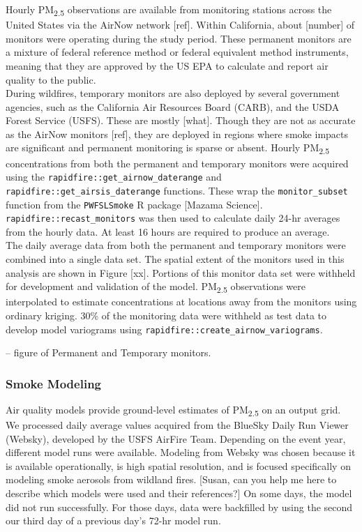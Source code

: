 \documentclass[gmd, manuscript]{copernicus}
\begin{document}
Hourly PM\textsubscript{2.5} observations are available from monitoring
stations across the United States via the AirNow network {[}ref{]}.
Within California, about {[}number{]} of monitors were operating during
the study period. These permanent monitors are a mixture of federal
reference method or federal equivalent method instruments, meaning that
they are approved by the US EPA to calculate and report air quality to
the public.\\
During wildfires, temporary monitors are also deployed by several
government agencies, such as the California Air Resources Board (CARB),
and the USDA Forest Service (USFS). These are mostly {[}what{]}. Though
they are not as accurate as the AirNow monitors {[}ref{]}, they are
deployed in regions where smoke impacts are significant and permanent
monitoring is sparse or absent. Hourly PM\textsubscript{2.5}
concentrations from both the permanent and temporary monitors were
acquired using the \texttt{rapidfire::get\_airnow\_daterange} and
\texttt{rapidfire::get\_airsis\_daterange} functions. These wrap the
\texttt{monitor\_subset} function from the \texttt{PWFSLSmoke} R package
{[}Mazama Science{]}. \texttt{rapidfire::recast\_monitors} was then used
to calculate daily 24-hr averages from the hourly data. At least 16
hours are required to produce an average.\\
The daily average data from both the permanent and temporary monitors
were combined into a single data set. The spatial extent of the monitors
used in this analysis are shown in Figure {[}xx{]}. Portions of this
monitor data set were withheld for development and validation of the
model. PM\textsubscript{2.5} observations were interpolated to estimate
concentrations at locations away from the monitors using ordinary
kriging. 30\% of the monitoring data were withheld as test data to
develop model variograms using
\texttt{rapidfire::create\_airnow\_variograms}.

-- figure of Permanent and Temporary monitors.

\subsubsection{Smoke Modeling}

Air quality models provide ground-level estimates of
PM\textsubscript{2.5} on an output grid. We processed daily average
values acquired from the BlueSky Daily Run Viewer (Websky), developed by
the USFS AirFire Team. Depending on the event year, different model runs
were available. Modeling from Websky was chosen because it is available
operationally, is high spatial resolution, and is focused specifically
on modeling smoke aerosols from wildland fires. {[}Susan, can you help
me here to describe which models were used and their references?{]} On
some days, the model did not run successfully. For those days, data were
backfilled by using the second our third day of a previous day's 72-hr
model run.
\end{document}
